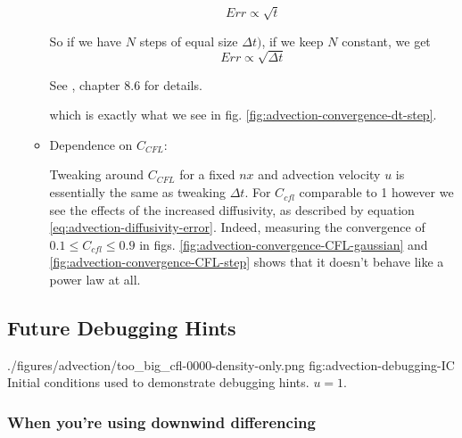 \begin{itemize}
\begin{itemize}
				\begin{equation*}
				     	Err \propto \sqrt{t}
				\end{equation*}
				
				So if we have $N$ steps of equal size $\Delta t)$, if we keep $N$ constant, we get
				\begin{equation}
				     	Err \propto \sqrt{\Delta t} \label{eq:advection-error-square-root}
				\end{equation}
				
				See \cite{leveque_2002}, chapter 8.6 for details.
				
				which is exactly what we see in  fig. \ref{fig:advection-convergence-dt-step}.
				
			
			\item  Dependence on $C_{CFL}$:
				
				Tweaking around $C_{CFL}$ for a fixed $nx$ and advection velocity $u$ is essentially the same as tweaking $\Delta t$.
				For $C_{cfl}$ comparable to 1 however we see the effects of the increased diffusivity, as described by equation \ref{eq:advection-diffusivity-error}.
				Indeed, measuring the convergence of $0.1 \leq C_{cfl} \leq 0.9 $ in figs. \ref{fig:advection-convergence-CFL-gaussian} and \ref{fig:advection-convergence-CFL-step} shows that it doesn't behave like a power law at all.
			
		\end{itemize}


     
     
\end{itemize}


















\subsection{Future Debugging Hints}




\quickfigcap
	{./figures/advection/too_big_cfl-0000-density-only.png}
	{fig:advection-debugging-IC}
	{Initial conditions used to demonstrate debugging hints. $u = 1$.}


\subsubsection{When you're using downwind differencing}

